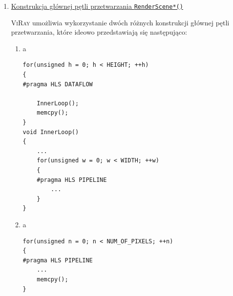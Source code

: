 \begin{enumerate}

\newpage %
\item \underline{Konstrukcja głównej pętli przetwarzania \texttt{RenderScene*()}}

\textsc{ViRay} umożliwia wykorzystanie dwóch różnych konstrukcji głównej pętli przetwarzania, które ideowo przedstawiają się następująco:
\begin{enumerate}
\item {\color{white}a}

\begin{lstlisting}
for(unsigned h = 0; h < HEIGHT; ++h)
{
#pragma HLS DATAFLOW
	
	InnerLoop();
	memcpy();
}
void InnerLoop()
{
	...
	for(unsigned w = 0; w < WIDTH; ++w)
	{
	#pragma HLS PIPELINE
		...
	}
}
\end{lstlisting}
\item {\color{white}a}
\begin{lstlisting}
for(unsigned n = 0; n < NUM_OF_PIXELS; ++n)
{
#pragma HLS PIPELINE
	...
	memcpy();
}
\end{lstlisting}


\end{enumerate}
\end{enumerate}
